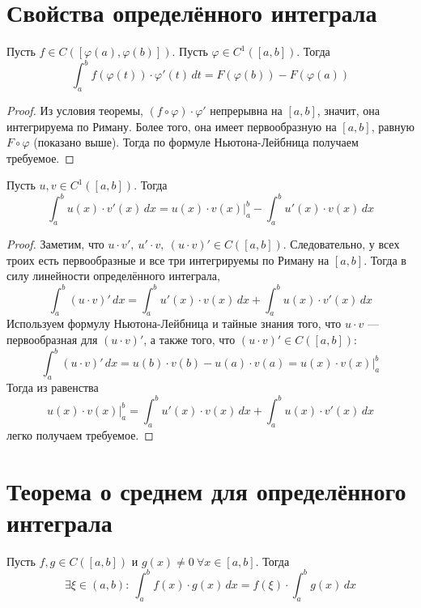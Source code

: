 \documentclass[11pt]{article}
\begin{document}
\section{Свойства определённого интеграла}

\begin{theorem}
    Пусть $f \in C([\varphi(a), \varphi(b)])$. Пусть $\varphi \in C^1([a, b])$. 
    Тогда \[\int_{a}^{b} f(\varphi(t)) \cdot \varphi'(t)\,dt = F(\varphi(b)) - F(\varphi(a))\] 
\end{theorem}

\begin{proof}
    Из условия теоремы, $(f \circ \varphi) \cdot \varphi'$ непрерывна на $[a, b]$, 
    значит, она интегрируема по Риману. Более того, она имеет первообразную на $[a, b]$,
    равную $F \circ \varphi$ (показано выше). Тогда по формуле Ньютона-Лейбница получаем требуемое.
\end{proof}

\begin{theorem}
    Пусть $u, v \in C^1([a, b])$. Тогда \[\int_{a}^{b}u(x) \cdot v'(x)\,dx = u(x)
    \cdot v(x) \bigg|_a^b - \int_{a}^{b} u'(x) \cdot v(x)\,dx \]
\end{theorem}

\begin{proof}
    Заметим, что $u\cdot v', \ u' \cdot v, \ (u \cdot v)' \in C([a, b])$. Следовательно, у всех
    троих есть первообразные и все три интегрируемы по Риману на $[a, b]$. Тогда 
    в силу линейности определённого интеграла, \[\int_{a}^{b} (u \cdot v)'\,dx =
    \int_{a}^{b} u'(x) \cdot v(x)\,dx + \int_{a}^{b} u(x) \cdot v'(x)\,dx\] 
    Используем формулу Ньютона-Лейбница и тайные знания того, что $u \cdot v$ --- 
    первообразная для $(u \cdot v)'$, а также того, что $(u \cdot v)' \in C([a, b])$: \[\int_{a}^{b} (u \cdot v)'\,dx = u(b) \cdot 
    v(b) - u(a) \cdot v(a) = u(x) \cdot v(x) \bigg|_a^b\] Тогда из равенства
    \[u(x) \cdot v(x) \bigg|_a^b = \int_{a}^{b} u'(x) \cdot v(x)\,dx + \int_{a}^{b} 
    u(x) \cdot v'(x)\,dx\] легко получаем требуемое.
\end{proof}

\section{Теорема о среднем для определённого интеграла}

\begin{theorem}
    Пусть $f, g \in C([a, b])$ и $g(x) \neq 0 \ \forall x \in [a, b]$. Тогда 
    \[\exists \xi \in (a, b): \ \int_{a}^{b} f(x) \cdot g(x)\,dx = f(\xi) \cdot 
    \int_{a}^{b} g(x)\,dx\] 
\end{theorem}
\end{document}
